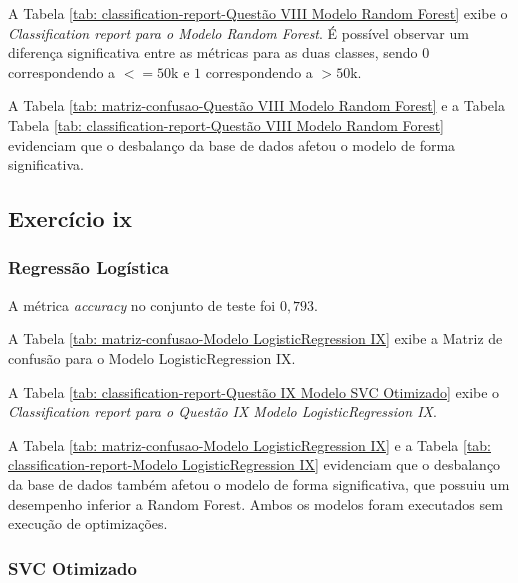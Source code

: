 

A Tabela \ref{tab: classification-report-Questão VIII  Modelo Random Forest} exibe o \textit{Classification report para o Modelo Random Forest}. É possível observar um diferença significativa entre as métricas para as duas classes, sendo $0$ correspondendo a $<=50$k e $1$ correspondendo a $>50$k.



A Tabela \ref{tab: matriz-confusao-Questão VIII Modelo Random Forest} e a Tabela Tabela \ref{tab: classification-report-Questão VIII  Modelo Random Forest} evidenciam que o desbalanço da base de dados afetou o modelo de forma significativa.

\subsection{Exercício ix}

\subsubsection{Regressão Logística}

A métrica \textit{accuracy} no conjunto de teste foi $0,793$. 

A Tabela \ref{tab: matriz-confusao-Modelo LogisticRegression IX} exibe a Matriz de confusão para o Modelo LogisticRegression IX.



A Tabela \ref{tab: classification-report-Questão IX Modelo SVC Otimizado} exibe o \textit{Classification report para o Questão IX Modelo LogisticRegression IX}.



A Tabela \ref{tab: matriz-confusao-Modelo LogisticRegression IX} e a Tabela \ref{tab: classification-report-Modelo LogisticRegression IX} evidenciam que o desbalanço da base de dados também afetou o modelo de forma significativa, que possuiu um desempenho inferior a Random Forest. Ambos os modelos foram executados sem execução de optimizações.

\subsubsection{SVC Otimizado}

